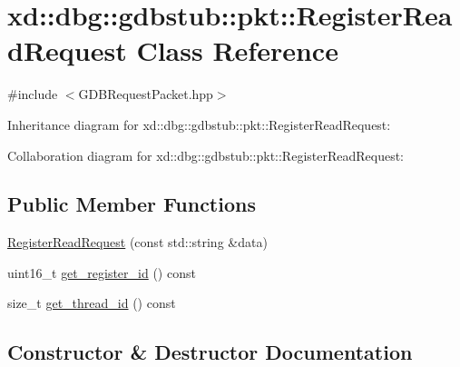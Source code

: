 \hypertarget{classxd_1_1dbg_1_1gdbstub_1_1pkt_1_1_register_read_request}{}\section{xd\+:\+:dbg\+:\+:gdbstub\+:\+:pkt\+:\+:Register\+Read\+Request Class Reference}
\label{classxd_1_1dbg_1_1gdbstub_1_1pkt_1_1_register_read_request}


{\ttfamily \#include $<$G\+D\+B\+Request\+Packet.\+hpp$>$}



Inheritance diagram for xd\+:\+:dbg\+:\+:gdbstub\+:\+:pkt\+:\+:Register\+Read\+Request\+:


Collaboration diagram for xd\+:\+:dbg\+:\+:gdbstub\+:\+:pkt\+:\+:Register\+Read\+Request\+:
\subsection*{Public Member Functions}
\begin{DoxyCompactItemize}
\item 
\mbox{\hyperlink{classxd_1_1dbg_1_1gdbstub_1_1pkt_1_1_register_read_request_a3ec8723f9598332c8c2fe9ecf4d70748}{Register\+Read\+Request}} (const std\+::string \&data)
\item 
uint16\+\_\+t \mbox{\hyperlink{classxd_1_1dbg_1_1gdbstub_1_1pkt_1_1_register_read_request_a64949ab7a8d7b84595a98440cfc6acbf}{get\+\_\+register\+\_\+id}} () const
\item 
size\+\_\+t \mbox{\hyperlink{classxd_1_1dbg_1_1gdbstub_1_1pkt_1_1_register_read_request_ab8c828d93ff6af637ebfec1fcaab302c}{get\+\_\+thread\+\_\+id}} () const
\end{DoxyCompactItemize}


\subsection{Constructor \& Destructor Documentation}
\mbox{\label{classxd_1_1dbg_1_1gdbstub_1_1pkt_1_1_register_read_request_a3ec8723f9598332c8c2fe9ecf4d70748}} 
